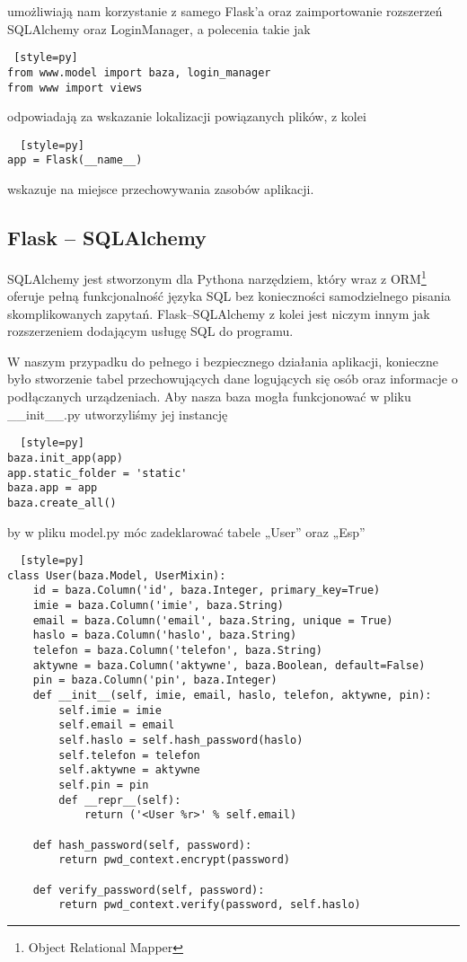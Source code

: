 \documentclass{xmgr}
\begin{document}
umożliwiają nam korzystanie z samego Flask’a oraz zaimportowanie rozszerzeń SQLAlchemy oraz LoginManager, a polecenia takie jak 
\begin{lstlisting} [style=py] 
from www.model import baza, login_manager  
from www import views
\end{lstlisting}
odpowiadają za wskazanie lokalizacji powiązanych plików, z kolei 
\begin{lstlisting}  [style=py] 
app = Flask(__name__)
\end{lstlisting}
wskazuje na miejsce przechowywania zasobów aplikacji. 

\subsection{Flask -- SQLAlchemy}

SQLAlchemy jest stworzonym dla Pythona narzędziem,  który wraz z ORM\footnote{Object Relational Mapper} oferuje pełną funkcjonalność języka SQL bez konieczności samodzielnego pisania skomplikowanych zapytań. Flask--SQLAlchemy z kolei jest niczym innym jak rozszerzeniem dodającym usługę SQL do programu. 

W naszym przypadku do pełnego i bezpiecznego działania aplikacji, konieczne było stworzenie tabel przechowujących dane logujących się osób oraz informacje o podłączanych urządzeniach.
Aby nasza baza mogła funkcjonować w pliku \_\_init\_\_.py utworzyliśmy jej instancję 

\begin{lstlisting}  [style=py] 
baza.init_app(app)
app.static_folder = 'static'
baza.app = app
baza.create_all()
\end{lstlisting}

by w pliku model.py móc zadeklarować tabele „User” oraz „Esp”

\label{Model}
\begin{lstlisting}  [style=py] 
class User(baza.Model, UserMixin):
    id = baza.Column('id', baza.Integer, primary_key=True)
    imie = baza.Column('imie', baza.String)
    email = baza.Column('email', baza.String, unique = True)
    haslo = baza.Column('haslo', baza.String)
    telefon = baza.Column('telefon', baza.String)
    aktywne = baza.Column('aktywne', baza.Boolean, default=False)
    pin = baza.Column('pin', baza.Integer)
    def __init__(self, imie, email, haslo, telefon, aktywne, pin):
        self.imie = imie
        self.email = email
        self.haslo = self.hash_password(haslo)
        self.telefon = telefon
        self.aktywne = aktywne
        self.pin = pin
        def __repr__(self):
            return ('<User %r>' % self.email)
    
    def hash_password(self, password):
        return pwd_context.encrypt(password)
    
    def verify_password(self, password):
        return pwd_context.verify(password, self.haslo)
\end{lstlisting}
\end{document}
